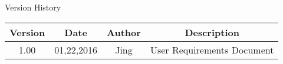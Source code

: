 Version History
 
\begin{table}[h!]
\centering
\begin{tabular}{||c c c c||} 
 \hline
 Version & Date & Author & Description \\ [0.5ex] 
 \hline\hline
 1.00 & 01,22,2016 & Jing & User Requirements Document \\ 
 [1ex] 
 \hline
\end{tabular}
\end{table}
